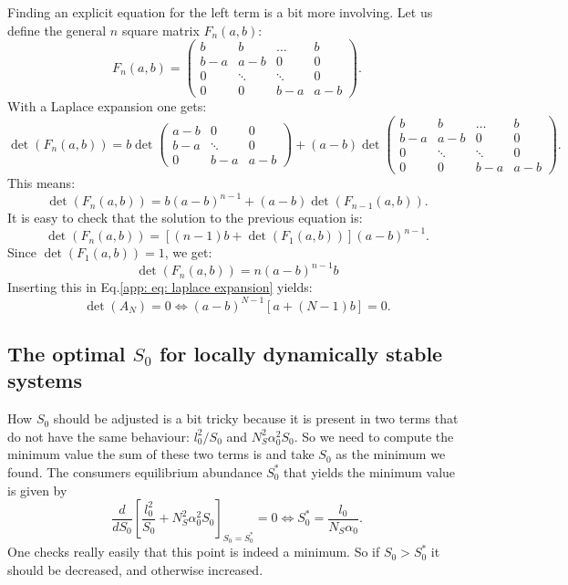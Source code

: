 \documentclass[12pt]{report}
\begin{document}
Finding an explicit equation for the left term is a bit more involving. Let us define the general $n$ square matrix $F_n(a,b)$:
\begin{equation}
F_n(a,b) = \begin{pmatrix}
b & b & \dots & b \\
b-a & a-b & 0 & 0 \\
0 & \ddots & \ddots & 0 \\
0 & 0 & b-a & a-b
\end{pmatrix}.
\end{equation}
With a Laplace expansion one gets:
\begin{equation}
\det\left(F_n(a,b)\right)= b
\det\begin{pmatrix}
a-b & 0 & 0 \\
b-a & \ddots & 0 \\
0 & b-a & a-b
\end{pmatrix}+(a-b)\det\begin{pmatrix}
b & b & \dots & b \\
b-a & a-b & 0 & 0 \\
0 & \ddots & \ddots & 0 \\
0 & 0 & b-a & a-b
\end{pmatrix}.
\end{equation}
This means:
\begin{equation}
\det(F_n(a,b))=b(a-b)^{n-1}+(a-b)\det(F_{n-1}(a,b)).
\end{equation}
It is easy to check that the solution to the previous equation is:
\begin{equation}
\det(F_n(a,b))=\left[(n-1)b+\det\left(F_1(a,b)\right)\right](a-b)^{n-1}.
\end{equation}
Since $\det\left(F_1(a,b)\right)=1$, we get:
\begin{equation}
\det\left(F_n(a,b)\right)=n(a-b)^{n-1}b
\end{equation}
Inserting this in Eq.\eqref{app: eq: laplace expansion} yields:
\begin{equation}
\boxed{
\det(A_N)=0 \iff (a-b)^{N-1}\left[a+(N-1)b\right]=0.
}\label{eq: formula special determinant}
\end{equation}
\subsection{The optimal $S_0$ for locally dynamically stable systems} \label{sec: appendix how to handle S0}
How $S_0$ should be adjusted is a bit tricky because it is present in two terms that do not have the same behaviour: $l_0^2/S_0$ and $N_S^2 \alpha_0^2 S_0$. So we need to compute the minimum value the sum of these two terms is and take $S_0$ as the minimum we found. The consumers equilibrium abundance $S_0^*$ that yields the minimum value is given by
\begin{equation}
\frac{d}{dS_0} \left[\frac{l_0^2}{S_0}+N_S^2\alpha_0^2 S_0\right]_{S_0=S_0^*}=0 \iff S_0^* = \frac{l_0}{N_S \alpha_0}.
\end{equation}
One checks really easily that this point is indeed a minimum. So if $S_0 > S_0^*$ it should be decreased, and otherwise increased.
\end{document}
